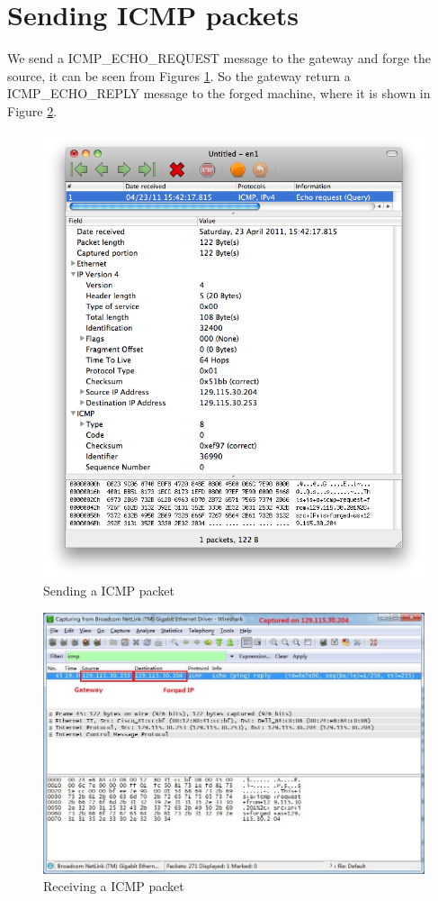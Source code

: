 \documentclass[12pt,letterpaper]{report}
\begin{document}
\section*{Sending ICMP packets}
We send a ICMP\_ECHO\_REQUEST message to the gateway 
and forge the source, it can be seen from Figures \ref{icmp1}. So 
the gateway return a ICMP\_ECHO\_REPLY message to the 
forged machine, where it is shown in Figure \ref{icmp2}.

\begin{figure}[!htp]
\centering
\includegraphics[width=0.8\linewidth]{icmp1.png}
\caption{Sending a ICMP packet}
\label{icmp1}
\end{figure}


\begin{figure}[!htp]
\centering
\includegraphics[width=\linewidth]{icmp2.jpg}
\caption{Receiving a ICMP packet}
\label{icmp2}
\end{figure}
\end{document}
